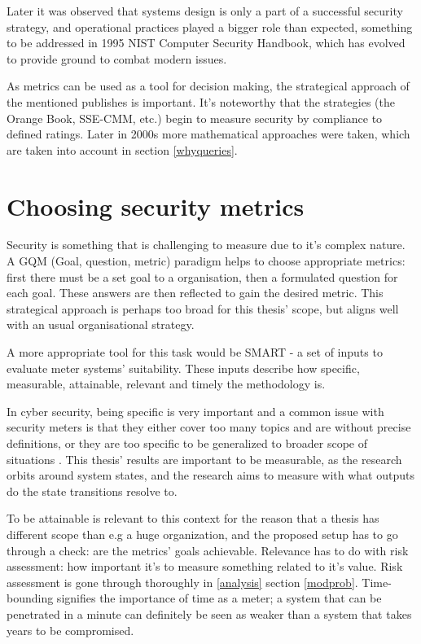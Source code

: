 Later it was observed that systems design is only a part of a
successful security strategy, and operational practices played a
bigger role than expected, something to be addressed in 1995 NIST
Computer Security Handbook, which has evolved to provide ground to
combat modern issues. \cite{bayuk2013measuring}

As metrics can be used as a tool for decision making, the strategical
approach of the mentioned publishes is important. It's noteworthy that
the strategies (the Orange Book, SSE-CMM, etc.) begin to measure
security by compliance to defined ratings. Later in 2000s more
mathematical approaches were taken, which are taken into account in
section \ref{whyqueries}. \cite{bayuk2013measuring}

\section{Choosing security metrics} \label{choosingsecmet}

Security is something that is challenging to measure due to it's
complex nature. A GQM (Goal, question, metric) paradigm helps to
choose appropriate metrics: first there must be a set goal to a
organisation, then a formulated question for each goal. These answers
are then reflected to gain the desired metric. This strategical
approach is perhaps too broad for this thesis' scope, but aligns well
with an usual organisational strategy. \cite{papazov2019cybersecurity}

A more appropriate tool for this task would be SMART - a set of inputs
to evaluate meter systems' suitability. These inputs describe how
specific, measurable, attainable, relevant and timely the methodology
is. \cite{payne2006guide}

In cyber security, being specific is very important and a common issue
with security meters is that they either cover too many topics and are
without precise definitions, or they are too specific to be
generalized to broader scope of situations
\cite{wang2005information}. This thesis' results are important to be
measurable, as the research orbits around system states, and the
research aims to measure with what outputs do the state transitions
resolve to.

To be attainable is relevant to this context for the reason that a
thesis has different scope than e.g a huge organization, and the
proposed setup has to go through a check: are the metrics' goals
achievable. Relevance has to do with risk assessment: how important
it's to measure something related to it's value. Risk assessment is
gone through thoroughly in \ref{analysis} section
\ref{modprob}. Time-bounding signifies the importance of time as a
meter; a system that can be penetrated in a minute can definitely be
seen as weaker than a system that takes years to be compromised.

